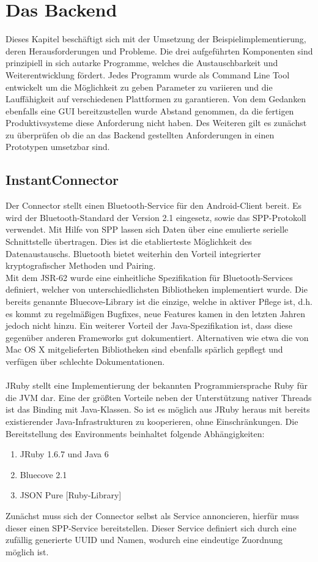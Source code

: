 \chapter{Das Backend}
Dieses Kapitel beschäftigt sich mit der Umsetzung der Beispielimplementierung, deren Herausforderungen und Probleme. Die drei aufgeführten Komponenten sind prinzipiell in sich autarke Programme, welches die Austauschbarkeit und Weiterentwicklung fördert. Jedes Programm wurde als Command Line Tool entwickelt um die Möglichkeit zu geben Parameter zu variieren und die Lauffähigkeit auf verschiedenen Plattformen zu garantieren. Von dem Gedanken ebenfalls eine GUI bereitzustellen wurde Abstand genommen, da die fertigen Produktivsysteme diese Anforderung nicht haben. Des Weiteren gilt es zunächst zu überprüfen ob die an das Backend gestellten Anforderungen in einen Prototypen umsetzbar sind. 
\section{InstantConnector}
Der Connector stellt einen Bluetooth-Service für den Android-Client bereit. 
Es wird der Bluetooth-Standard der Version 2.1 eingesetz, sowie das SPP-Protokoll verwendet. Mit Hilfe von SPP lassen sich Daten über eine emulierte serielle Schnittstelle übertragen. Dies ist die etablierteste Möglichkeit des Datenaustauschs. Bluetooth bietet weiterhin den Vorteil integrierter kryptografischer Methoden und Pairing. \\
Mit dem JSR-62 wurde eine einheitliche Spezifikation für Bluetooth-Services definiert, welcher von unterschiedlichsten Bibliotheken implementiert wurde. Die bereits genannte Bluecove-Library ist die einzige, welche in aktiver Pflege ist, d.h. es kommt zu regelmäßigen Bugfixes, neue Features kamen in den letzten Jahren jedoch nicht hinzu. Ein weiterer Vorteil der Java-Spezifikation ist, dass diese gegenüber anderen Frameworks gut dokumentiert. Alternativen wie etwa die von Mac OS X mitgelieferten Bibliotheken sind ebenfalls spärlich gepflegt und verfügen über schlechte Dokumentationen. 
\\\\
JRuby stellt eine Implementierung der bekannten Programmiersprache Ruby für die JVM dar. Eine der größten Vorteile neben der Unterstützung nativer Threads ist das Binding mit Java-Klassen. So ist es möglich aus JRuby heraus mit bereits existierender Java-Infrastrukturen zu kooperieren, ohne Einschränkungen. Die Bereitstellung des Environments beinhaltet folgende Abhängigkeiten:
\begin{enumerate}
     \item JRuby 1.6.7 und Java 6
     \item Bluecove 2.1
     \item JSON Pure [Ruby-Library]
\end{enumerate}
Zunächst muss sich der Connector selbst als Service annoncieren, hierfür muss dieser einen SPP-Service bereitstellen. Dieser Service definiert sich durch eine zufällig generierte UUID und Namen, wodurch eine eindeutige Zuordnung möglich ist. 

